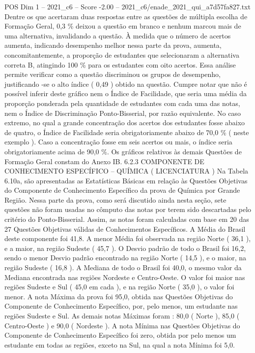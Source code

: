 \begin{textsample}{POS Dim 1 – 2021\_c6 – Score -2.00 – 2021\_c6/enade\_2021\_qui\_a7d57fa827.txt}
Dentre os que acertaram duas respostas entre as questões de múltipla escolha de Formação Geral, 0,3 \% deixou a questão em branco e nenhum marcou mais de uma alternativa, invalidando a questão.
À medida que o número de acertos aumenta, indicando desempenho melhor nessa parte da prova, aumenta, concomitantemente, a proporção de estudantes que selecionaram a alternativa correta B, atingindo 100 \% para os estudantes com oito acertos.
Essa análise permite verificar como a questão discriminou os grupos de desempenho, justificando -se o alto índice ( 0,49 ) obtido na questão.
Cumpre notar que não é possível inferir deste gráfico nem o Índice de Facilidade, que seria uma média da proporção ponderada pela quantidade de estudantes com cada uma das notas, nem o Índice de Discriminação Ponto-Bisserial, por razão equivalente.
No caso extremo, no qual a grande concentração dos acertos dos estudantes fosse abaixo de quatro, o Índice de Facilidade seria obrigatoriamente abaixo de 70,0 \% ( neste exemplo ).
Caso a concentração fosse em seis acertos ou mais, o índice seria obrigatoriamente acima de 90,0 \%.
Os gráficos relativos às demais Questões de Formação Geral constam do Anexo IB. 6.2.3 COMPONENTE DE CONHECIMENTO ESPECÍFICO – QUÍMICA ( LICENCIATURA ) Na Tabela 6.10a, são apresentadas as Estatísticas Básicas em relação às Questões Objetivas do Componente de Conhecimento Específico da prova de Química por Grande Região.
Nessa parte da prova, como será discutido ainda nesta seção, sete questões não foram usadas no cômputo das notas por terem sido descartadas pelo critério do Ponto-Bisserial.
Assim, as notas foram calculadas com base em 20 das 27 Questões Objetivas válidas de Conhecimentos Específicos.
A Média do Brasil deste componente foi 41,8.
A menor Média foi observada na região Norte ( 36,1 ), e a maior, na região Sudeste ( 45,7 ).
O Desvio padrão de todo o Brasil foi 16,2, sendo o menor Desvio padrão encontrado na região Norte ( 14,5 ), e o maior, na região Sudeste ( 16,8 ).
A Mediana de todo o Brasil foi 40,0, o mesmo valor da Mediana encontrada nas regiões Nordeste e Centro-Oeste.
O valor foi maior nas regiões Sudeste e Sul ( 45,0 em cada ), e na região Norte ( 35,0 ), o valor foi menor.
A nota Máxima da prova foi 95,0, obtida nas Questões Objetivas do Componente de Conhecimento Específico, por, pelo menos, um estudante nas regiões Sudeste e Sul.
As demais notas Máximas foram : 80,0 ( Norte ), 85,0 ( Centro-Oeste ) e 90,0 ( Nordeste ).
A nota Mínima nas Questões Objetivas do Componente de Conhecimento Específico foi zero, obtida por pelo menos um estudante em todas as regiões, exceto na Sul, na qual a nota Mínima foi 5,0.

\end{textsample}
